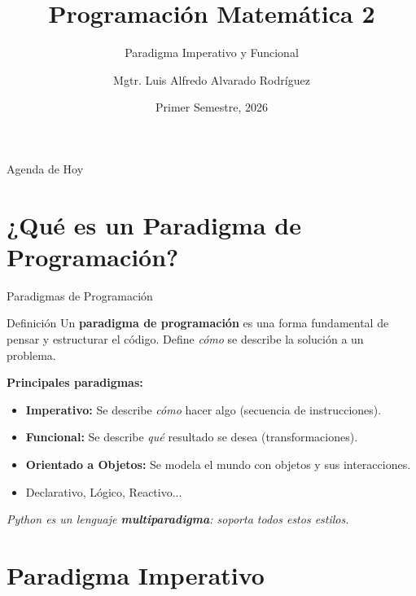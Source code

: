 \documentclass[aspectratio=169]{beamer}
\title[PM2]{Programación Matemática 2}
\subtitle{Paradigma Imperativo y Funcional}
\author[Luis Alfredo Alvarado]{Mgtr. Luis Alfredo Alvarado Rodríguez}
\institute[ECFM - USAC]{
    Escuela de Ciencias Físicas y Matemáticas \\
    Universidad de San Carlos de Guatemala
}
\date{Primer Semestre, 2026}
\begin{document}
\begin{frame}
    \titlepage
\end{frame}

\begin{frame}{Agenda de Hoy}
    \tableofcontents
\end{frame}

\section{¿Qué es un Paradigma de Programación?}

\begin{frame}{Paradigmas de Programación}
    \begin{block}{Definición}
        Un \textbf{paradigma de programación} es una forma fundamental de pensar y estructurar el código. Define \textit{cómo} se describe la solución a un problema.
    \end{block}
    \vspace{0.5cm}
    
    \textbf{Principales paradigmas:}
    \begin{itemize}
        \item \textbf{Imperativo:} Se describe \textit{cómo} hacer algo (secuencia de instrucciones).
        \item \textbf{Funcional:} Se describe \textit{qué} resultado se desea (transformaciones).
        \item \textbf{Orientado a Objetos:} Se modela el mundo con objetos y sus interacciones.
        \item Declarativo, Lógico, Reactivo...
    \end{itemize}
    \vspace{0.3cm}
    \centering
    \textit{Python es un lenguaje \textbf{multiparadigma}: soporta todos estos estilos.}
\end{frame}

\section{Paradigma Imperativo}
\end{document}
